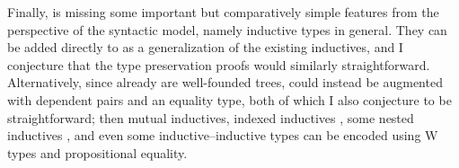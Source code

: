 Finally, \lang is missing some important but comparatively simple features
from the perspective of the syntactic model, namely inductive types in general.
They can be added directly to \lang as a generalization of the existing inductives,
and I conjecture that the type preservation proofs would similarly straightforward.
Alternatively, since already are well-founded trees,
\lang could instead be augmented with dependent pairs and an equality type,
both of which I also conjecture to be straightforward;
then mutual inductives, indexed inductives \citep{whynotW}, some nested inductives \citep{barras},
and even some inductive--inductive types \citep{ind-ind}
can be encoded using W types and propositional equality.